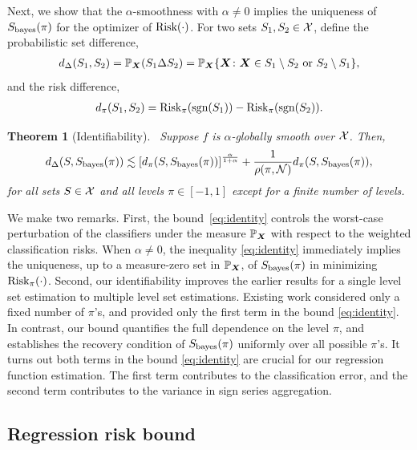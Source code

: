 \documentclass[aos]{imsart}
\newtheorem{theorem}{Theorem}%
\theoremstyle{definition}
\def\sign{\textup{sgn}}
\def\risk{\textup{Risk}}
\def\bayesS{S_{\textup{bayes}}}
\begin{document}
Next, we show that the $\alpha$-smoothness with $\alpha\neq 0$ implies the uniqueness of $\bayesS(\pi)$ for the optimizer of $\risk(\cdot)$. For two sets $S_1, S_2\in \mathcal{X}$, define the probabilistic set difference, 
\begin{align*} %
d_{\Delta}(S_1,S_2) = \mathbb{P}_{\mX}(S_1\Delta S_2)=\mathbb{P}_{\mX}\{\mX\colon \mX\in S_1\setminus S_2 \text{ or }S_2\setminus S_1\},
\end{align*}
and the risk difference,
\begin{align*} %
d_\pi(S_1,S_2) = \risk_\pi(\sign(S_1))-\risk_\pi(\sign(S_2)).
\end{align*}

\begin{theorem}[Identifiability]~\label{thm:identifiability} Suppose $f$ is $\alpha$-globally smooth over $\mathcal{X}$. Then,
\begin{align}\label{eq:identity}
d_{\Delta}(S,\bayesS(\pi)) \lesssim \left[d_\pi(S,\bayesS(\pi))\right]^{\alpha\over 1+\alpha}+{1\over\rho(\pi, \tN)} d_\pi(S,\bayesS(\pi)),
\end{align}
for all sets $S\in\mathcal{X}$ and all levels $\pi\in[-1,1]$ except for a finite number of levels.
\end{theorem}

\noindent
We make two remarks. First, the bound~\eqref{eq:identity} controls the worst-case perturbation of the classifiers under the measure $\mathbb{P}_{\bm X}$ with respect to the weighted classification risks. When $\alpha \neq 0$, the inequality \eqref{eq:identity} immediately implies the uniqueness, up to a measure-zero set in $\mathbb{P}_{\bm X}$, of $\bayesS(\pi)$ in minimizing $\risk_\pi(\cdot)$. Second, our identifiability improves the earlier results for a single level set estimation to multiple level set estimations. Existing work \citep{singh2009adaptive,xu2020class} considered only a fixed number of $\pi$'s, and provided only the first term in the bound \eqref{eq:identity}. In contrast, our bound quantifies the full dependence on the level $\pi$, and establishes the recovery condition of $\bayesS(\pi)$ uniformly over all possible $\pi$'s. It turns out both terms in the bound \eqref{eq:identity} are crucial for our regression function estimation. The first term contributes to the classification error, and the second term contributes to the variance in sign series aggregation. 



\subsection{Regression risk bound}
\end{document}
